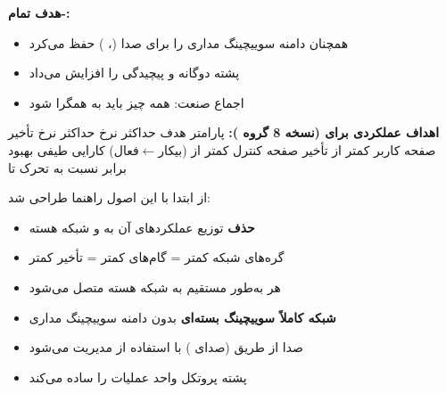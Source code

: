 \textbf{هدف تمام-:}

\begin{itemize}
\tightlist
\item
   همچنان دامنه سوییچینگ مداری را برای صدا (، ) حفظ می‌کرد
\item
  پشته دوگانه  و پیچیدگی را افزایش می‌داد
\item
  اجماع صنعت: همه چیز باید به  همگرا شود
\end{itemize}

\textbf{اهداف عملکردی برای  (نسخه 8 گروه ):}\CNbr{}\lr{\textbar{}} پارامتر \lr{\textbar{}} هدف \lr{\textbar{}}\CNbr{}\CNbr{}\lr{\textbar{}} حداکثر نرخ \CNbr{}\lr{\textbar{}} حداکثر نرخ \CNbr{}\lr{\textbar{}} تأخیر صفحه کاربر \lr{\textbar{}} کمتر از  \lr{\textbar{}}\CNbr{}\lr{\textbar{}} تأخیر صفحه کنترل \lr{\textbar{}} کمتر از  (بیکار\ensuremath{\leftarrow}فعال) \lr{\textbar{}}\CNbr{}\lr{\textbar{}} کارایی طیفی \lr{\textbar{}} بهبود  برابر نسبت به  \lr{\textbar{}}\CNbr{}\lr{\textbar{}} تحرک \lr{\textbar{}} تا  \lr{\textbar{}}


 از ابتدا با این اصول راهنما طراحی شد:


\begin{itemize}
\tightlist
\item
  \textbf{حذف }  توزیع عملکردهای آن به  و شبکه هسته
\item
  گره‌های شبکه کمتر = گام‌های کمتر = تأخیر کمتر
\item
  هر  به‌طور مستقیم به شبکه هسته  متصل می‌شود
\end{itemize}


\begin{itemize}
\tightlist
\item
  \textbf{شبکه کاملاً سوییچینگ بسته‌ای}  بدون دامنه سوییچینگ مداری
\item
  صدا از طریق  (صدای ) با استفاده از  مدیریت می‌شود
\item
  پشته پروتکل واحد عملیات را ساده می‌کند
\end{itemize}

